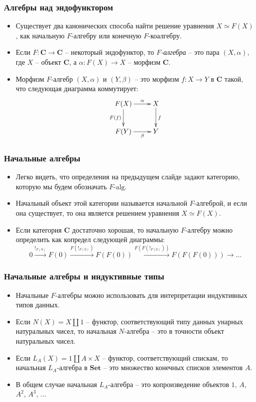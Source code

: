 \documentclass{beamer}
\theoremstyle{definition}
\newcommand{\cat}[1]{\mathbf{#1}}
\renewcommand{\C}{\cat{C}}
\newcommand{\Set}{\cat{Set}}
\begin{document}
\begin{frame}
\frametitle{Алгебры над эндофунктором}
\begin{itemize}
\item Существует два канонических способа найти решение уравнения $X \simeq F(X)$, как начальную $F$-алгебру или конечную $F$-коалгебру.
\item Если $F : \C \to \C$ -- некоторый эндофунктор, то \emph{$F$-алгебра} -- это пара $(X,\alpha)$, где $X$ -- объект $\C$, а $\alpha : F(X) \to X$ -- морфизм $\C$.
\item Морфизм $F$-алгебр $(X,\alpha)$ и $(Y,\beta)$ -- это морфизм $f : X \to Y$ в $\C$ такой, что следующая диаграмма коммутирует:
\[ \xymatrix{ F(X) \ar[r]^-\alpha \ar[d]_{F(f)} & X \ar[d]^f \\
              F(Y) \ar[r]_-\beta                & Y
            } \]
\end{itemize}
\end{frame}

\begin{frame}
\frametitle{Начальные алгебры}
\begin{itemize}
\item Легко видеть, что определения на предыдущем слайде задают категорию, которую мы будем обозначать $F\text{-}\mathrm{alg}$.
\item Начальный объект этой категории называется начальной $F$-алгеброй, и если она существует, то она является решением уравнения $X \simeq F(X)$.
\item Если категория $\C$ достаточно хорошая, то начальную $F$-алгебру можно определить как копредел следующей диаграммы:
\[ 0 \xrightarrow{!_{F(0)}} F(0) \xrightarrow{F(!_{F(0)})} F(F(0)) \xrightarrow{F(F(!_{F(0)}))} F(F(F(0))) \to \ldots \]
\end{itemize}
\end{frame}

\begin{frame}
\frametitle{Начальные алгебры и индуктивные типы}
\begin{itemize}
\item Начальные $F$-алгебры можно использовать для интерпретации индуктивных типов данных.
\item Если $N(X) = X \amalg 1$ -- функтор, соответствующий типу данных унарных натуральных чисел, то начальная $N$-алгебра -- это в точности объект натуральных чисел.
\item Если $L_A(X) = 1 \amalg A \times X$ -- функтор, соответствующий спискам, то начальная $L_A$-алгебра в $\Set$ -- это множество конечных списков элементов $A$.
\item В общем случае начальная $L_A$-алгебра -- это копроизведение объектов $1$, $A$, $A^2$, $A^3$, ...
\end{itemize}
\end{frame}
\end{document}
